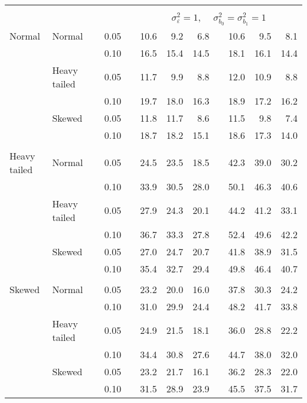 \begin{table}[ht]
\begin{scriptsize}
\begin{tabular}{ll p{.1cm} c p{.1cm} rrr p{.1cm} rrr}
&&&&&&&&&&&\\
& && && \multicolumn{7}{c}{$\sigma_{\varepsilon}^2 = 1$, \ \ $\sigma_{b_0}^2 = \sigma_{b_1}^2 = 1$} \\ \cline{6-12}
\rowcolor{gray!20} Normal & Normal &  & 0.05 &  & 10.6 & 9.2 & 6.8 &  & 10.6 & 9.5 & 8.1 \\ 
\rowcolor{gray!20}    &  &  & 0.10 &  & 16.5 & 15.4 & 14.5 &  & 18.1 & 16.1 & 14.4 \\ 
\rowcolor{gray!20}    & Heavy tailed &  & 0.05 &  & 11.7 & 9.9 & 8.8 &  & 12.0 & 10.9 & 8.8 \\ 
\rowcolor{gray!20}    &  &  & 0.10 &  & 19.7 & 18.0 & 16.3 &  & 18.9 & 17.2 & 16.2 \\ 
\rowcolor{gray!20}    & Skewed &  & 0.05 &  & 11.8 & 11.7 & 8.6 &  & 11.5 & 9.8 & 7.4 \\ 
\rowcolor{gray!20}    &  &  & 0.10 &  & 18.7 & 18.2 & 15.1 &  & 18.6 & 17.3 & 14.0 \\ 
&&&&&&&&&&&\\
  Heavy tailed & Normal &  & 0.05 &  & 24.5 & 23.5 & 18.5 &  & 42.3 & 39.0 & 30.2 \\ 
   &  &  & 0.10 &  & 33.9 & 30.5 & 28.0 &  & 50.1 & 46.3 & 40.6 \\ 
   & Heavy tailed &  & 0.05 &  & 27.9 & 24.3 & 20.1 &  & 44.2 & 41.2 & 33.1 \\ 
   & &  & 0.10 &  & 36.7 & 33.3 & 27.8 &  & 52.4 & 49.6 & 42.2 \\ 
   & Skewed &  & 0.05 &  & 27.0 & 24.7 & 20.7 &  & 41.8 & 38.9 & 31.5 \\ 
   &  &  & 0.10 &  & 35.4 & 32.7 & 29.4 &  & 49.8 & 46.4 & 40.7 \\ 
&&&&&&&&&&&\\
  Skewed & Normal &  & 0.05 &  & 23.2 & 20.0 & 16.0 &  & 37.8 & 30.3 & 24.2 \\ 
   &  &  & 0.10 &  & 31.0 & 29.9 & 24.4 &  & 48.2 & 41.7 & 33.8 \\ 
   & Heavy tailed &  & 0.05 &  & 24.9 & 21.5 & 18.1 &  & 36.0 & 28.8 & 22.2 \\ 
   &  &  & 0.10 &  & 34.4 & 30.8 & 27.6 &  & 44.7 & 38.0 & 32.0 \\ 
   & Skewed &  & 0.05 &  & 23.2 & 21.7 & 16.1 &  & 36.2 & 28.3 & 22.0 \\ 
   &  &  & 0.10 &  & 31.5 & 28.9 & 23.9 &  & 45.5 & 37.5 & 31.7 \\ 




\end{tabular}
\end{scriptsize}
\end{table}
